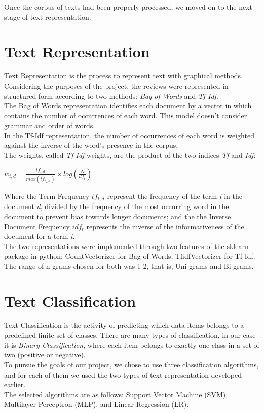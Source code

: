 \documentclass[fleqn,10pt]{SelfArx} %
\begin{document}
Once the corpus of texts had been properly processed, we moved on to the next stage of text representation.

\section{Text Representation}
Text Representation is the process to represent text with graphical methods. Considering the purposes of the project, the reviews were represented in structured form according to two methods: \textit{Bag of Words} and \textit{Tf-Idf}.\\
The Bag of Words representation identifies each document by a vector in which contains the number of occurrences of each word. This model doesn't consider grammar and order of words.\\
In the Tf-Idf representation, the number of occurrences of each word is weighted against the inverse of the word's presence in the corpus.\\
The weights, called \textit{Tf-Idf} weights, are the product of the two indices \textit{Tf} and \textit{Idf}:
\begin{center}
$w_{t,d} = \frac{tf_{t,d}}{max (tf_{t_i,d})} \times log(\frac{N}{df_t})$
\end{center}
Where the Term Frequency \textit{$tf_{t,d}$} represent the frequency of the term \textit{t} in the document \textit{d}, divided by the frequency of the most occurring word in the document to prevent bias towards longer documents; and the the Inverse Document Frequency \textit{$idf_t$} represents the inverse of the informativeness of the document for a term \textit{t}.\\
The two representations were implemented through two features of the sklearn package in python: CountVectorizer for Bag of Words, TfidfVectorizer for Tf-Idf. The range of n-grams chosen for both was 1-2, that is, Uni-grams and Bi-grams.

\section{Text Classification}
Text Classification is the activity of predicting which data items belongs to a predefined finite set of classes. There are many types of classification, in our case it is \textit{Binary Classification}, where each item belongs to exactly one class in a set of two (positive or negative).\\
To pursue the goals of our project, we chose to use three classification algorithms, and for each of them we used the two types of text representation developed earlier.\\
The selected algorithms are as follows: Support Vector Machine (SVM), Multilayer Perceptron (MLP), and Linear Regression (LR).
\end{document}
